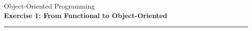 \documentclass[10pt,a4paper]{exam}
\begin{document}
\newcommand{\course}{Object-Oriented Programming}
\newcommand{\week}{1}
\newcommand{\topics}{From Functional to Object-Oriented}

\everymath{\color{campurpledark}}
\everydisplay{\color{campurpledark}}




\marksnotpoints
\pointsdroppedatright
\marksnotpoints
\marginpointname{ \points}

\begin{center}
\Large {\color{campurpledark} \course} \\[-0.2cm]
\LARGE \textbf{\color{campurpledark} Exercise \week: \topics} \\
\end{center}

{\color{campurple}\hrule}

\vspace{0.5cm}
\end{document}
